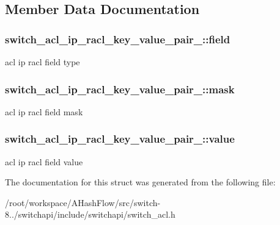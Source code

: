 \subsection{Member Data Documentation}
\hypertarget{structswitch__acl__ip__racl__key__value__pair___a24d821a9e5e0f574edbd705850525c23}{
\subsubsection[{field}]{ switch\+\_\+acl\+\_\+ip\+\_\+racl\+\_\+key\+\_\+value\+\_\+pair\+\_\+\+::field}}\label{structswitch__acl__ip__racl__key__value__pair___a24d821a9e5e0f574edbd705850525c23}
acl ip racl field type \hypertarget{structswitch__acl__ip__racl__key__value__pair___ae13b0cca10f22b15224df0b9840adc92}{
\subsubsection[{mask}]{ switch\+\_\+acl\+\_\+ip\+\_\+racl\+\_\+key\+\_\+value\+\_\+pair\+\_\+\+::mask}}\label{structswitch__acl__ip__racl__key__value__pair___ae13b0cca10f22b15224df0b9840adc92}
acl ip racl field mask \hypertarget{structswitch__acl__ip__racl__key__value__pair___a19c5c367fd1880297829af499a9a2505}{
\subsubsection[{value}]{ switch\+\_\+acl\+\_\+ip\+\_\+racl\+\_\+key\+\_\+value\+\_\+pair\+\_\+\+::value}}\label{structswitch__acl__ip__racl__key__value__pair___a19c5c367fd1880297829af499a9a2505}
acl ip racl field value 

The documentation for this struct was generated from the following file\+:\begin{DoxyCompactItemize}
\item 
/root/workspace/\+A\+Hash\+Flow/src/switch-\/8../switchapi/include/switchapi/switch\+\_\+acl.\+h\end{DoxyCompactItemize}
